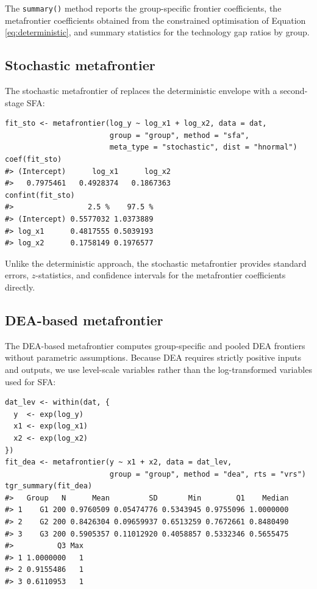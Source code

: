 The \texttt{summary()} method reports the group-specific frontier coefficients, the
metafrontier coefficients obtained from the constrained optimisation of
Equation \eqref{eq:deterministic}, and summary statistics for the technology gap ratios
by group.

\subsection{Stochastic metafrontier}\label{sec:stoch-metafrontier-usage}

The stochastic metafrontier of \citet{huang2014} replaces the deterministic envelope
with a second-stage SFA:

\begin{verbatim}
fit_sto <- metafrontier(log_y ~ log_x1 + log_x2, data = dat,
                        group = "group", method = "sfa",
                        meta_type = "stochastic", dist = "hnormal")
coef(fit_sto)
#> (Intercept)      log_x1      log_x2 
#>   0.7975461   0.4928374   0.1867363
confint(fit_sto)
#>                 2.5 %    97.5 %
#> (Intercept) 0.5577032 1.0373889
#> log_x1      0.4817555 0.5039193
#> log_x2      0.1758149 0.1976577
\end{verbatim}

Unlike the deterministic approach, the stochastic metafrontier provides
standard errors, \(z\)-statistics, and confidence intervals for the metafrontier
coefficients directly.

\subsection{DEA-based metafrontier}\label{sec:dea-metafrontier-usage}

The DEA-based metafrontier computes group-specific and pooled DEA frontiers
without parametric assumptions. Because DEA requires strictly positive inputs
and outputs, we use level-scale variables rather than the log-transformed
variables used for SFA:

\begin{verbatim}
dat_lev <- within(dat, {
  y  <- exp(log_y)
  x1 <- exp(log_x1)
  x2 <- exp(log_x2)
})
fit_dea <- metafrontier(y ~ x1 + x2, data = dat_lev,
                        group = "group", method = "dea", rts = "vrs")
tgr_summary(fit_dea)
#>   Group   N      Mean         SD       Min        Q1    Median
#> 1    G1 200 0.9760509 0.05474776 0.5343945 0.9755096 1.0000000
#> 2    G2 200 0.8426304 0.09659937 0.6513259 0.7672661 0.8480490
#> 3    G3 200 0.5905357 0.11012920 0.4058857 0.5332346 0.5655475
#>          Q3 Max
#> 1 1.0000000   1
#> 2 0.9155486   1
#> 3 0.6110953   1
\end{verbatim}

